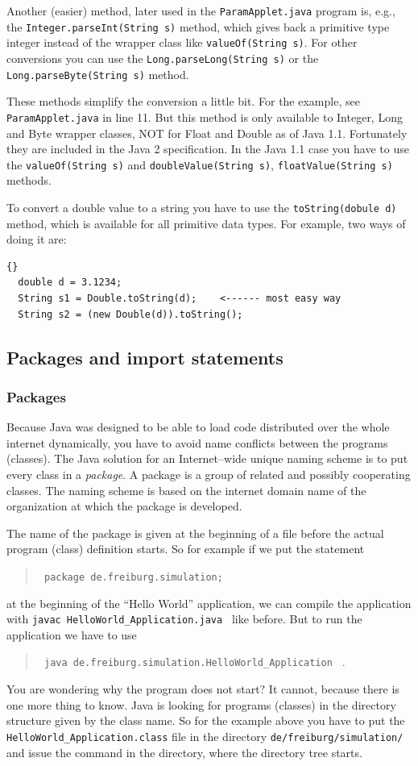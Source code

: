 Another (easier) method, 
later used in the \verb|ParamApplet.java| program is, e.g.,
the \verb|Integer.parseInt(String s)| method, which gives back a primitive
type integer instead of the wrapper class like \verb|valueOf(String s)|.
For other conversions you can use the \verb|Long.parseLong(String s)| or the
\verb|Long.parseByte(String s)| method.

These methods  simplify the conversion a little bit. For the example, see
\verb|ParamApplet.java| in line 11. But this method is only 
available to Integer, Long and Byte wrapper classes, NOT for
Float and Double as of Java 1.1. Fortunately they are included in the
Java 2 specification.
In the Java 1.1 case you have to use the \verb|valueOf(String s)| and
\verb|doubleValue(String s)|, \verb|floatValue(String s)| methods.

To convert a double value to a string you have to use the \verb|toString(dobule d)|
method, which is available for all primitive data types.
For example, two ways of doing it are:
\begin{lstlisting}{}
  double d = 3.1234;
  String s1 = Double.toString(d);    <------ most easy way
  String s2 = (new Double(d)).toString();
\end{lstlisting} 



\subsection{Packages and import statements}
\subsubsection{Packages}
Because Java was designed to be able to load code distributed
over the whole internet dynamically, you have to avoid name conflicts
between the programs (classes). The Java solution 
for an Internet--wide unique naming scheme is to put
every class in a \emph{package}. A package  is a group of related
and possibly cooperating classes. The naming scheme is based on the
internet domain name of the organization at which the package is developed.

The name of the package is given
at the beginning of a file before the actual program (class)
definition starts. So for example if we put the statement
\begin{quotation}
  \verb/ package de.freiburg.simulation; / 
\end{quotation}
at the beginning of the ``Hello World'' application, we can compile
the application with \verb/javac HelloWorld_Application.java / like before.
But to run the application we have to use
\begin{quotation}
  \verb/ java de.freiburg.simulation.HelloWorld_Application / . 
\end{quotation}
You are wondering why the program does not start? It cannot, because
there is one more thing to know. Java is looking for programs (classes)
in the directory structure given by the class name. So
for the example above you have to put the \verb/HelloWorld_Application.class/ file
in the directory \verb|de/freiburg/simulation/| and issue the command
in the directory, where the directory tree starts.

